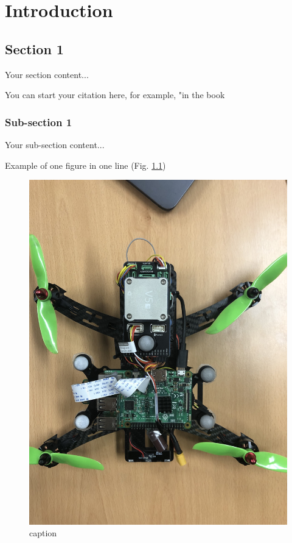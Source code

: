 \chapter{Introduction} 

\label{Introduction}

\section{Section 1}
Your section content...

You can start your citation here, for example, "in the book \cite{titterton2004strapdown}
\subsection{Sub-section 1}
Your sub-section content...

Example of one figure in one line (Fig. \ref{drone_fig_1})

\begin{figure}
	\centering
	\includegraphics[width=\textwidth,keepaspectratio]{Figures/drone_setup.jpg}
	\caption{caption}
	\label{drone_fig_1}
\end{figure}
	

